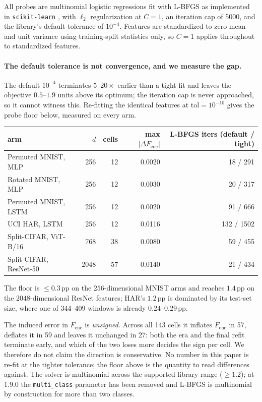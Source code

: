 All probes are multinomial logistic regressions fit with L-BFGS
\citep{liu1989limited} as implemented in \texttt{scikit-learn}
\citep{pedregosa2011scikit}, with $\ell_2$ regularization at $C = 1$, an
iteration cap of 5000, and the library's default tolerance of $10^{-4}$.
Features are standardized to zero mean and unit variance using training-split
statistics only, so $C = 1$ applies throughout to standardized features.

\paragraph{The default tolerance is not convergence, and we measure the gap.}
The default $10^{-4}$ terminates $5$--$20\times$ earlier than a tight fit and
leaves the objective $0.5$--$1.9$ units above its optimum; the iteration cap is
never approached, so it cannot witness this. Re-fitting the identical features
at $\mathrm{tol} = 10^{-10}$ gives the probe floor below, measured on every arm.

\begin{center}
\begin{tabular}{lrrrr}
\toprule
arm & $d$ & cells & max $|\Delta F_{\mathrm{enc}}|$ & L-BFGS iters (default / tight) \\
\midrule
Permuted MNIST, MLP   &  256 & 12 & 0.0020 & 18 / 291 \\
Rotated MNIST, MLP    &  256 & 12 & 0.0030 & 20 / 317 \\
Permuted MNIST, LSTM  &  256 & 12 & 0.0020 & 91 / 666 \\
UCI HAR, LSTM         &  256 & 12 & 0.0116 & 132 / 1502 \\
Split-CIFAR, ViT-B/16 &  768 & 38 & 0.0080 & 59 / 455 \\
Split-CIFAR, ResNet-50 & 2048 & 57 & 0.0140 & 21 / 434 \\
\bottomrule
\end{tabular}
\end{center}

The floor is $\le 0.3$\,pp on the $256$-dimensional MNIST arms and reaches
$1.4$\,pp on the $2048$-dimensional ResNet features; HAR's $1.2$\,pp is
dominated by its test-set size, where one of 344--409 windows is already
$0.24$--$0.29$\,pp.

The induced error in $F_{\mathrm{enc}}$ is \emph{unsigned}. Across all 143 cells
it inflates $F_{\mathrm{enc}}$ in 57, deflates it in 59 and leaves it unchanged
in 27: both the era and the final refit terminate early, and which of the two
loses more decides the sign per cell. We therefore do not claim the direction is
conservative. No number in this paper is re-fit at the tighter tolerance; the
floor above is the quantity to read differences against. The
solver is multinomial across the supported library range ($\ge 1.2$); at 1.9.0
the \texttt{multi\_class} parameter has been removed and L-BFGS is multinomial
by construction for more than two classes.

